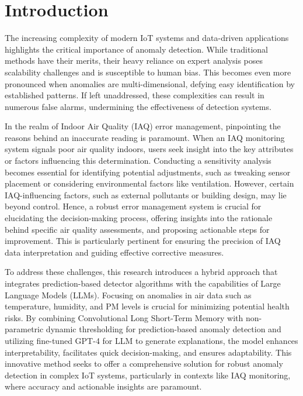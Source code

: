 \documentclass[final,3p,times,twocolumn]{elsarticle}
\begin{document}

\section{Introduction}\label{sec1}
The increasing complexity of modern IoT systems and data-driven applications highlights the critical importance of anomaly detection. While traditional methods have their merits, their heavy reliance on expert analysis poses scalability challenges and is susceptible to human bias. This becomes even more pronounced when anomalies are multi-dimensional, defying easy identification by established patterns. If left unaddressed, these complexities can result in numerous false alarms, undermining the effectiveness of detection systems.

In the realm of Indoor Air Quality (IAQ) error management, pinpointing the reasons behind an inaccurate reading is paramount. When an IAQ monitoring system signals poor air quality indoors, users seek insight into the key attributes or factors influencing this determination. Conducting a sensitivity analysis becomes essential for identifying potential adjustments, such as tweaking sensor placement or considering environmental factors like ventilation. However, certain IAQ-influencing factors, such as external pollutants or building design, may lie beyond control. Hence, a robust error management system is crucial for elucidating the decision-making process, offering insights into the rationale behind specific air quality assessments, and proposing actionable steps for improvement. This is particularly pertinent for ensuring the precision of IAQ data interpretation and guiding effective corrective measures.

To address these challenges, this research introduces a hybrid approach that integrates prediction-based detector algorithms with the capabilities of Large Language Models (LLMs). Focusing on anomalies in air data such as temperature, humidity, and PM levels is crucial for minimizing potential health risks. By combining Convolutional Long Short-Term Memory with non-parametric dynamic thresholding for prediction-based anomaly detection and utilizing fine-tuned GPT-4 for LLM to generate explanations, the model enhances interpretability, facilitates quick decision-making, and ensures adaptability. This innovative method seeks to offer a comprehensive solution for robust anomaly detection in complex IoT systems, particularly in contexts like IAQ monitoring, where accuracy and actionable insights are paramount.
\end{document}
